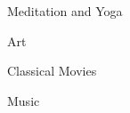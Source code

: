 \vspace*{10pt}
\begin{zitemize}

\item[\ding{86}]{Meditation and Yoga}
\item[\ding{86}]{Art}
\item[\ding{86}]{Classical Movies}
\item[\ding{86}]{Music}

\end{zitemize}
\vspace*{5pt}